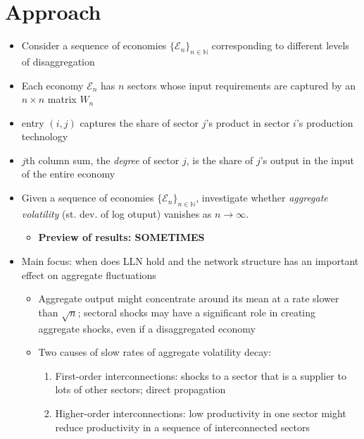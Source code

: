 \section{Approach}
\begin{itemize}
\item Consider a sequence of economies $\{\mathcal{E}_n\}_{n \in \mathbb{N}}$ corresponding to different levels of disaggregation
\item Each economy $\mathcal{E}_n$ has $n$ sectors whose input requirements are captured by an $n \times n$ matrix $W_n$
  \item entry $(i, j)$ captures the share of sector $j$'s product in sector $i$'s production technology
  \item $j$th column sum, the \emph{degree} of sector $j$, is the share of $j$'s output in the input of the entire economy
  \item Given a sequence of economies $\{\mathcal{E}_n\}_{n \in \mathbb{N}}$, investigate whether \emph{aggregate volatility} (st. dev. of log otuput) vanishes as $n \to \infty$.
    \begin{itemize}
    \item \textbf{Preview of results: SOMETIMES}
    \end{itemize}
  \item Main focus: when does LLN hold and the network structure has an important effect on aggregate fluctuations
    \begin{itemize}
    \item Aggregate output might concentrate around its mean at a rate slower than $\sqrt{n}$; sectoral shocks may have a significant role in creating aggregate shocks, even if a disaggregated economy
    \item Two causes of slow rates of aggregate volatility decay:
      \begin{enumerate}
      \item First-order interconnections: shocks to a sector that is a supplier to lots of other sectors; direct propagation
        \item Higher-order interconnections: low productivity in one sector might reduce productivity in a sequence of interconnected sectors
      \end{enumerate}
    \end{itemize}
\end{itemize}

